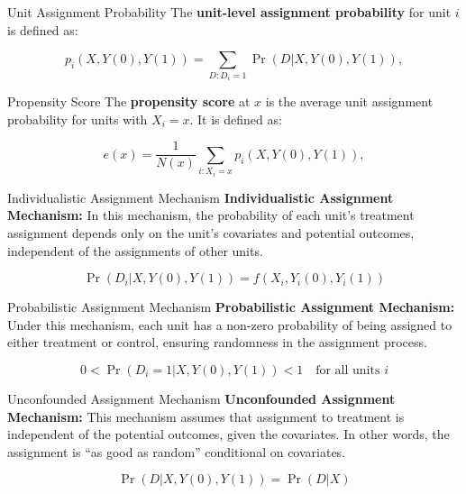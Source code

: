 \documentclass[xcolor=svgnames,t]{beamer}
\begin{document}
\begin{frame}{Unit Assignment Probability}
    The \textbf{unit-level assignment probability} for unit \( i \) is defined as:

    \[
    p_i(X, Y(0), Y(1)) = \sum_{D : D_i = 1} \Pr(D | X, Y(0), Y(1)),
    \]

  
\end{frame}



\begin{frame}{Propensity Score}
    The \textbf{propensity score} at \( x \) is the average unit assignment probability for units with \( X_i = x \). It is defined as:

    \[
    e(x) = \frac{1}{N(x)} \sum_{i : X_i = x} p_i(X, Y(0), Y(1)),
    \]


\end{frame}

\begin{frame}{Individualistic Assignment Mechanism}
    \textbf{Individualistic Assignment Mechanism:} In this mechanism, the probability of each unit's treatment assignment depends only on the unit's covariates and potential outcomes, independent of the assignments of other units.
    
    \[
    \Pr(D_i | X, Y(0), Y(1)) = f(X_i, Y_i(0), Y_i(1))
    \]
    
   
\end{frame}

\begin{frame}{Probabilistic Assignment Mechanism}
    \textbf{Probabilistic Assignment Mechanism:} Under this mechanism, each unit has a non-zero probability of being assigned to either treatment or control, ensuring randomness in the assignment process.
    
    \[
    0 < \Pr(D_i = 1 | X, Y(0), Y(1)) < 1 \quad \text{for all units } i
    \]
    
   
\end{frame}

\begin{frame}{Unconfounded Assignment Mechanism}
    \textbf{Unconfounded Assignment Mechanism:} This mechanism assumes that assignment to treatment is independent of the potential outcomes, given the covariates. In other words, the assignment is “as good as random” conditional on covariates.
    
    \[
    \Pr(D | X, Y(0), Y(1)) = \Pr(D | X)
    \]
    
    
\end{frame}
\end{document}
